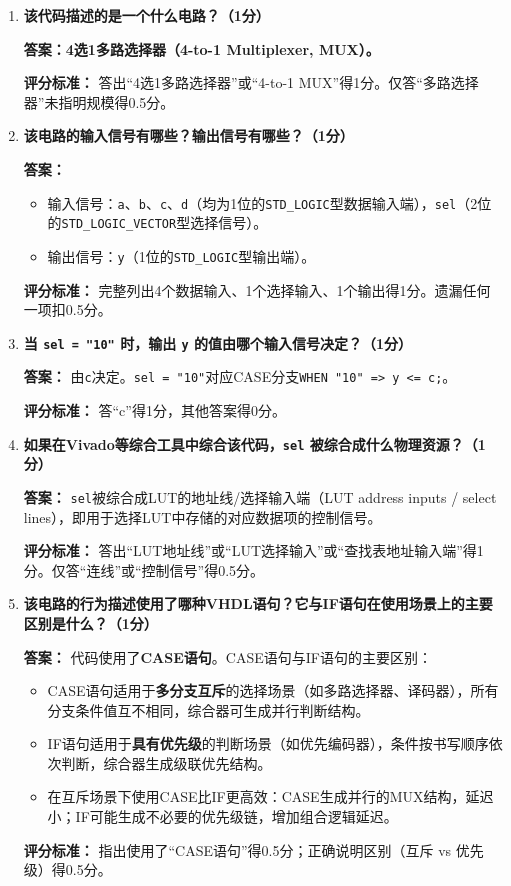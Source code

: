 \begin{enumerate}[label=(\arabic*)]

\item \textbf{该代码描述的是一个什么电路？（1分）}

\textbf{答案：4选1多路选择器（4-to-1 Multiplexer, MUX）。}

\textbf{评分标准：} 答出“4选1多路选择器”或“4-to-1 MUX”得1分。仅答“多路选择器”未指明规模得0.5分。

\item \textbf{该电路的输入信号有哪些？输出信号有哪些？（1分）}

\textbf{答案：}
\begin{itemize}[leftmargin=*,itemsep=0pt]
\item 输入信号：\texttt{a}、\texttt{b}、\texttt{c}、\texttt{d}（均为1位的\texttt{STD\_LOGIC}型数据输入端），\texttt{sel}（2位的\texttt{STD\_LOGIC\_VECTOR}型选择信号）。
\item 输出信号：\texttt{y}（1位的\texttt{STD\_LOGIC}型输出端）。
\end{itemize}

\textbf{评分标准：} 完整列出4个数据输入、1个选择输入、1个输出得1分。遗漏任何一项扣0.5分。

\item \textbf{当 \texttt{sel = "10"} 时，输出 \texttt{y} 的值由哪个输入信号决定？（1分）}

\textbf{答案：} 由\texttt{c}决定。\texttt{sel = "10"}对应CASE分支\texttt{WHEN "10" => y <= c;}。

\textbf{评分标准：} 答“c”得1分，其他答案得0分。

\item \textbf{如果在Vivado等综合工具中综合该代码，\texttt{sel} 被综合成什么物理资源？（1分）}

\textbf{答案：} \texttt{sel}被综合成LUT的地址线/选择输入端（LUT address inputs / select lines），即用于选择LUT中存储的对应数据项的控制信号。

\textbf{评分标准：} 答出“LUT地址线”或“LUT选择输入”或“查找表地址输入端”得1分。仅答“连线”或“控制信号”得0.5分。

\item \textbf{该电路的行为描述使用了哪种VHDL语句？它与IF语句在使用场景上的主要区别是什么？（1分）}

\textbf{答案：}
代码使用了\textbf{CASE语句}。CASE语句与IF语句的主要区别：
\begin{itemize}[leftmargin=*,itemsep=0pt]
\item CASE语句适用于\textbf{多分支互斥}的选择场景（如多路选择器、译码器），所有分支条件值互不相同，综合器可生成并行判断结构。
\item IF语句适用于\textbf{具有优先级}的判断场景（如优先编码器），条件按书写顺序依次判断，综合器生成级联优先结构。
\item 在互斥场景下使用CASE比IF更高效：CASE生成并行的MUX结构，延迟小；IF可能生成不必要的优先级链，增加组合逻辑延迟。
\end{itemize}

\textbf{评分标准：} 指出使用了“CASE语句”得0.5分；正确说明区别（互斥 vs 优先级）得0.5分。

\end{enumerate}

